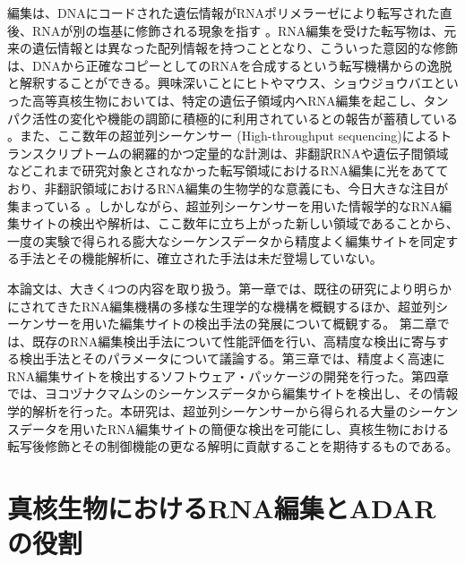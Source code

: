 編集は、DNAにコードされた遺伝情報がRNAポリメラーゼにより転写された直後、RNAが別の塩基に修飾される現象を指す \citep{Wulff:2010aa}。RNA編集を受けた転写物は、元来の遺伝情報とは異なった配列情報を持つこととなり、こういった意図的な修飾は、DNAから正確なコピーとしてのRNAを合成するという転写機構からの逸脱と解釈することができる。興味深いことにヒトやマウス、ショウジョウバエといった高等真核生物においては、特定の遺伝子領域内へRNA編集を起こし、タンパク活性の変化や機能の調節に積極的に利用されているとの報告が蓄積している \citep{Pullirsch:2010aa}。また、ここ数年の超並列シーケンサー (High-throughput sequencing)によるトランスクリプトームの網羅的かつ定量的な計測は、非翻訳RNAや遺伝子間領域などこれまで研究対象とされなかった転写領域におけるRNA編集に光をあてており、非翻訳領域におけるRNA編集の生物学的な意義にも、今日大きな注目が集まっている \citep{Nishikura:2006aa, Nis10}。しかしながら、超並列シーケンサーを用いた情報学的なRNA編集サイトの検出や解析は、ここ数年に立ち上がった新しい領域であることから、一度の実験で得られる膨大なシーケンスデータから精度よく編集サイトを同定する手法とその機能解析に、確立された手法は未だ登場していない。
\par
本論文は、大きく4つの内容を取り扱う。第一章では、既往の研究により明らかにされてきたRNA編集機構の多様な生理学的な機構を概観するほか、超並列シーケンサーを用いた編集サイトの検出手法の発展について概観する。
第二章では、既存のRNA編集検出手法について性能評価を行い、高精度な検出に寄与する検出手法とそのパラメータについて議論する。第三章では、精度よく高速にRNA編集サイトを検出するソフトウェア・パッケージの開発を行った。第四章では、ヨコヅナクマムシのシーケンスデータから編集サイトを検出し、その情報学的解析を行った。本研究は、超並列シーケンサーから得られる大量のシーケンスデータを用いたRNA編集サイトの簡便な検出を可能にし、真核生物における転写後修飾とその制御機能の更なる解明に貢献することを期待するものである。

\newpage

\section{真核生物におけるRNA編集とADARの役割}
